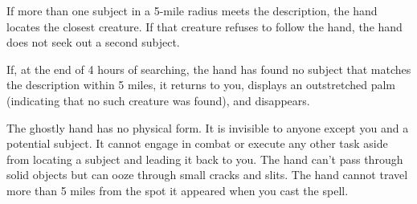 {	If more than one subject in a 5-mile radius meets the description, the hand locates the closest creature. If that creature refuses to follow the hand, the hand does not seek out a second subject.

	If, at the end of 4 hours of searching, the hand has found no subject that matches the description within 5 miles, it returns to you, displays an outstretched palm (indicating that no such creature was found), and disappears.

	The ghostly hand has no physical form. It is invisible to anyone except you and a potential subject. It cannot engage in combat or execute any other task aside from locating a subject and leading it back to you. The hand can't pass through solid objects but can ooze through small cracks and slits. The hand cannot travel more than 5 miles from the spot it appeared when you cast the spell.

}
